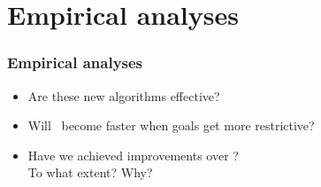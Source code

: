 %
%
%
%

\section{Empirical analyses}
\begin{frame} 
\frametitle{Empirical analyses}
\Large
	\begin{itemize}
		\item Are these new algorithms \textcolor{ao}{effective}?
		\vspace{3mm}
		\item Will \lexgo \ become faster when goals get \textcolor{ao}{more restrictive}?
		\vspace{3mm}
		\item Have we achieved \textcolor{ao}{improvements over \namoa}? \\ 
		To what extent? Why?
	\end{itemize}
\end{frame}
